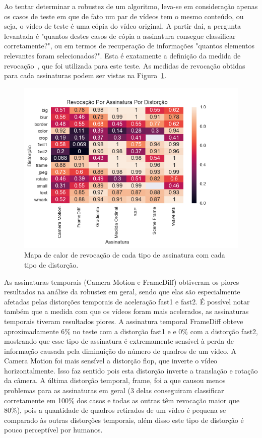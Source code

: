 Ao tentar determinar a robustez de um algoritmo, leva-se em consideração apenas os casos de teste em que de fato um par de vídeos tem o mesmo conteúdo, ou seja, o vídeo de teste é uma cópia do vídeo original. A partir daí, a pergunta levantada é "quantos destes casos de cópia a assinatura consegue classificar corretamente?", ou em termos de recuperação de informações "quantos elementos relevantes foram selecionados?". Esta é exatamente a definição da medida de revocação~\cite{Ting2010}, que foi utilizada para este teste. As medidas de revocação obtidas para cada assinaturas podem ser vistas na Figura~\ref{fig:heatmap-revocacao}.


\begin{figure}[h]
	\centering
	\caption{Mapa de calor de revocação de cada tipo de assinatura com cada tipo de distorção.}
	\label{fig:heatmap-revocacao}
	\includegraphics[width=\textwidth]{dados/figuras/experimentos/heatmap_final_recall.png}	
\end{figure}

As assinaturas temporais (Camera Motion e FrameDiff) obtiveram os piores resultados na análise da robustez em geral, sendo que elas são especialmente afetadas pelas distorções temporais de aceleração fast1 e fast2. É possível notar também que a medida com que os vídeos foram mais acelerados, as assinaturas temporais tiveram resultados piores. A assinatura temporal FrameDiff obteve aproximadamente 6\% no teste com a distorção fast1 e e 0\% com a distorção fast2, mostrando que esse tipo de assinatura é extremamente sensível à perda de informação causada pela diminuição do número de quadros de um vídeo. A Camera Motion foi mais sensível a distorção flop, que inverte o vídeo horizontalmente. Isso faz sentido pois esta distorção inverte a translação e rotação da câmera. A última distorção temporal, frame, foi a que causou menos problemas para as assinaturas em geral (3 delas conseguiram classificar corretamente em 100\% dos casos e todas as outras têm revocação maior que 80\%), pois a quantidade de quadros retirados de um vídeo é pequena se comparado às outras distorções temporais, além disso este tipo de distorção é pouco perceptível por humanos.

